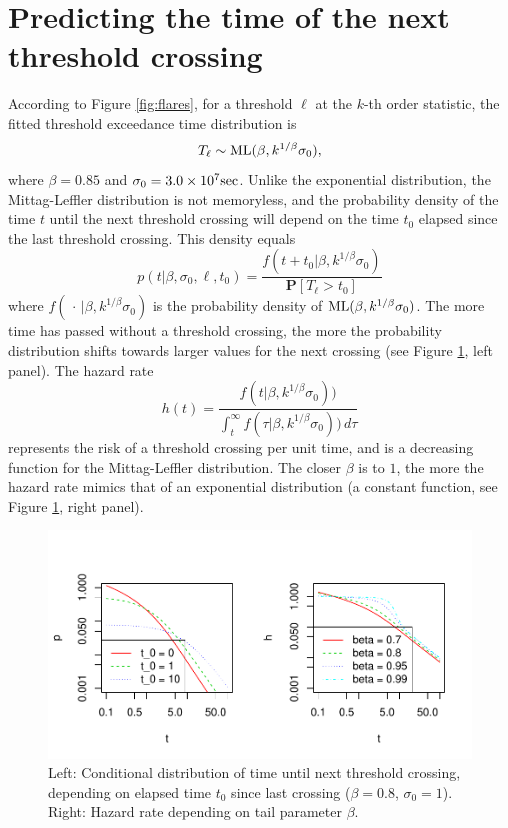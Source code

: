 \documentclass[smallextended]{svjour3}       %
\begin{document}
\section{Predicting the time of the next threshold
crossing}\label{predicting-the-time-of-the-next-threshold-crossing}

According to Figure \ref{fig:flares}, for a threshold \(\ell\) at the
\(k\)-th order statistic, the fitted threshold exceedance time
distribution is \[
T_\ell \sim {\rm ML}(\beta, k^{1/\beta} \sigma_0), 
\] where \(\beta = 0.85\) and \(\sigma_0 = 3.0 \times 10^7 {\rm sec}\).
Unlike the exponential distribution, the Mittag-Leffler distribution is
not memoryless, and the probability density of the time \(t\) until the
next threshold crossing will depend on the time \(t_0\) elapsed since
the last threshold crossing. This density equals \[
p(t|\beta, \sigma_0, \ell, t_0) = \frac{f(t + t_0 | \beta, k^{1/\beta} \sigma_0)}{\mathbf P[T_\ell > t_0]}
\] where \(f(\,\cdot\, | \beta, k^{1/\beta} \sigma_0)\) is the
probability density of \({\rm ML}(\beta, k^{1/\beta} \sigma_0)\). The
more time has passed without a threshold crossing, the more the
probability distribution shifts towards larger values for the next
crossing (see Figure \ref{fig:hazard}, left panel). The hazard rate \[
h(t) = \frac{f(t| \beta, k^{1/\beta} \sigma_0))}{\int_t^\infty f(\tau| \beta, k^{1/\beta} \sigma_0))\,d\tau}
\] represents the risk of a threshold crossing per unit time, and is a
decreasing function for the Mittag-Leffler distribution. The closer
\(\beta\) is to \(1\), the more the hazard rate mimics that of an
exponential distribution (a constant function, see Figure
\ref{fig:hazard}, right panel).

\begin{figure}
\includegraphics[width=\textwidth]{article_springer_files/figure-latex/hazard-1} \caption{Left: Conditional distribution of time until next threshold crossing, depending on elapsed time $t_0$ since last crossing ($\beta = 0.8$, $\sigma_0 = 1$). Right: Hazard rate depending on tail parameter $\beta$.\label{fig:hazard}}\label{fig:hazard}
\end{figure}
\end{document}
